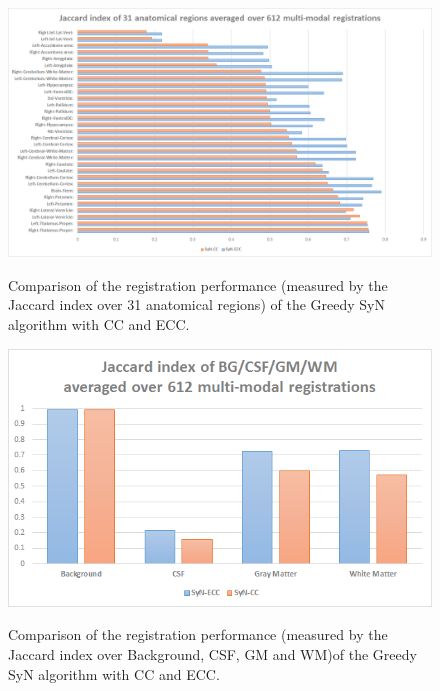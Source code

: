 \documentclass[11pt]{article}
\begin{document}
\begin{figure}[H]
\centering
\label{fig:graph_seg}\includegraphics[width=1.0\linewidth]{./images/graph_seg.png}\\
\caption{Comparison of the registration performance (measured by the Jaccard index over 31 anatomical regions) of the Greedy SyN algorithm with CC and ECC.}
\end{figure}

\begin{figure}[H]
\centering
\label{fig:graph_segTri_fill}\includegraphics[width=1.0\linewidth]{./images/graph_segTri_fill.png}\\
\caption{Comparison of the registration performance (measured by the Jaccard index over Background, CSF, GM and WM)of the Greedy SyN algorithm with CC and ECC.}
\end{figure}



\end{document}
